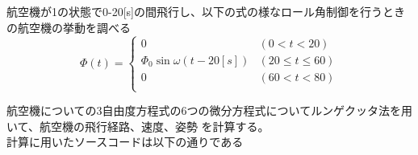 \documentclass[15pt,uplatex,dvipdfmx]{jsarticle}
\begin{document}
\section{}
航空機が1の状態で0-20[s]の間飛行し、以下の式の様なロール角制御を行うときの航空機の挙動を調べる
\begin{equation}
  \Phi(t) =
  \begin{cases}
      0 & (0<t<20) \\
      {\Phi}_0 \sin{\omega(t-20[s])} & (20≤t≤60) \\
      0 & (60<t<80) \\
  \end{cases}
\end{equation}

航空機についての3自由度方程式の6つの微分方程式についてルンゲクッタ法を用いて、航空機の飛行経路、速度、姿勢
を計算する。\\
計算に用いたソースコードは以下の通りである \\
\end{document}
